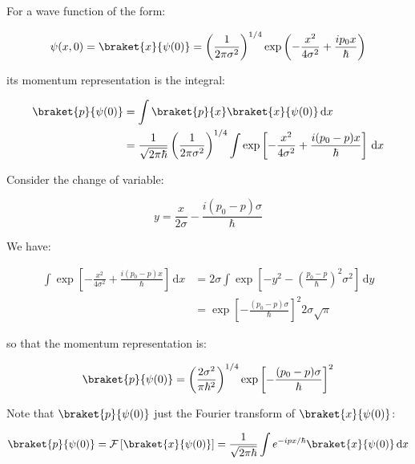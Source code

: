 \documentclass[12pt]{article}
\begin{document}
For a wave function of the form:

\begin{equation}
    \psi(x, 0) = \braket{x}{\psi(0)} = \left( \frac{1}{2\pi \sigma^{2}} \right)^{1/4} \exp \left( -\frac{x^{2}}{4\sigma^{2}} + \frac{ip_{0}x}{\hbar} \right)
\end{equation}

its momentum representation is the integral:

\begin{equation}
    \begin{split}
        \braket{p}{\psi(0)} &= \int \braket{p}{x} \braket{x}{\psi(0)} \, \mathrm{d}x \\
        &= \frac{1}{\sqrt{2\pi\hbar}} \left( \frac{1}{2\pi \sigma^{2}} \right)^{1/4} \int \exp \left[ -\frac{x^{2}}{4\sigma^{2}} + \frac{i(p_{0} - p)x}{\hbar} \right] \, \mathrm{d}x \\
    \end{split}
\end{equation}

Consider the change of variable:

\begin{equation}
    y = \frac{x}{2\sigma} - \frac{i(p_{0} - p)\sigma}{\hbar}
\end{equation}

We have:

\begin{equation}
    \begin{split}
        \int \exp \left[ -\frac{x^{2}}{4\sigma^{2}} + \frac{i(p_{0} - p)x}{\hbar} \right] \, \mathrm{d}x &= 2\sigma \int \exp \left[ -y^{2} - \left( \frac{p_{0} - p}{\hbar} \right)^{2} \sigma^{2} \right] \, \mathrm{d}y \\
        &= \exp \left[ -\frac{(p_{0} - p)\sigma}{\hbar} \right]^{2} 2\sigma \sqrt{\pi}
    \end{split}
\end{equation}

so that the momentum representation is:

\begin{equation}
    \braket{p}{\psi(0)} = \left( \frac{2\sigma^{2}}{\pi \hbar^{2}} \right)^{1/4} \exp \left[ -\frac{(p_{0} - p)\sigma}{\hbar} \right]^{2}
\end{equation}

Note that $\braket{p}{\psi(0)}$ just the Fourier transform of $\braket{x}{\psi(0)}$:

\begin{equation}
    \braket{p}{\psi(0)} = \mathcal{F} \left[ \braket{x}{\psi(0)} \right] = \frac{1}{\sqrt{2\pi\hbar}} \int e^{-ipx/\hbar} \braket{x}{\psi(0)} \, \mathrm{d}x
\end{equation}
\end{document}
